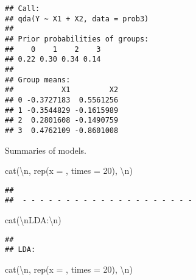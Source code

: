 \documentclass[
]{article}
\newenvironment{Shaded}{\begin{snugshade}}{\end{snugshade}}
\newcommand{\AttributeTok}[1]{\textcolor[rgb]{0.77,0.63,0.00}{#1}}
\newcommand{\DecValTok}[1]{\textcolor[rgb]{0.00,0.00,0.81}{#1}}
\newcommand{\FunctionTok}[1]{\textcolor[rgb]{0.00,0.00,0.00}{#1}}
\newcommand{\NormalTok}[1]{#1}
\newcommand{\SpecialCharTok}[1]{\textcolor[rgb]{0.00,0.00,0.00}{#1}}
\newcommand{\StringTok}[1]{\textcolor[rgb]{0.31,0.60,0.02}{#1}}
\begin{document}
\begin{verbatim}
## Call:
## qda(Y ~ X1 + X2, data = prob3)
## 
## Prior probabilities of groups:
##    0    1    2    3 
## 0.22 0.30 0.34 0.14 
## 
## Group means:
##           X1         X2
## 0 -0.3727183  0.5561256
## 1 -0.3544829 -0.1615989
## 2  0.2801608 -0.1490759
## 3  0.4762109 -0.8601008
\end{verbatim}

Summaries of models.

\begin{Shaded}
\begin{Highlighting}[]
\FunctionTok{cat}\NormalTok{(}\StringTok{\textquotesingle{}}\SpecialCharTok{\textbackslash{}n}\StringTok{\textquotesingle{}}\NormalTok{, }\FunctionTok{rep}\NormalTok{(}\AttributeTok{x =} \StringTok{\textquotesingle{}{-}\textquotesingle{}}\NormalTok{, }\AttributeTok{times =} \DecValTok{20}\NormalTok{), }\StringTok{\textquotesingle{}}\SpecialCharTok{\textbackslash{}n}\StringTok{\textquotesingle{}}\NormalTok{)}
\end{Highlighting}
\end{Shaded}

\begin{verbatim}
## 
##  - - - - - - - - - - - - - - - - - - - -
\end{verbatim}

\begin{Shaded}
\begin{Highlighting}[]
\FunctionTok{cat}\NormalTok{(}\StringTok{\textquotesingle{}}\SpecialCharTok{\textbackslash{}n}\StringTok{LDA:}\SpecialCharTok{\textbackslash{}n}\StringTok{\textquotesingle{}}\NormalTok{)}
\end{Highlighting}
\end{Shaded}

\begin{verbatim}
## 
## LDA:
\end{verbatim}

\begin{Shaded}
\begin{Highlighting}[]
\FunctionTok{cat}\NormalTok{(}\StringTok{\textquotesingle{}}\SpecialCharTok{\textbackslash{}n}\StringTok{\textquotesingle{}}\NormalTok{, }\FunctionTok{rep}\NormalTok{(}\AttributeTok{x =} \StringTok{\textquotesingle{}{-}\textquotesingle{}}\NormalTok{, }\AttributeTok{times =} \DecValTok{20}\NormalTok{), }\StringTok{\textquotesingle{}}\SpecialCharTok{\textbackslash{}n}\StringTok{\textquotesingle{}}\NormalTok{)}
\end{Highlighting}
\end{Shaded}
\end{document}
